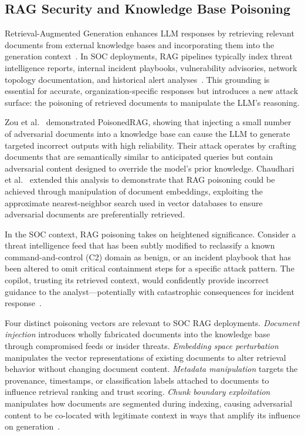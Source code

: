 \documentclass[journal,twoside]{IEEEtran}
\begin{document}
\subsection{RAG Security and Knowledge Base Poisoning}
\label{sec:bg_rag}

Retrieval-Augmented Generation enhances LLM responses by retrieving relevant documents from external knowledge bases and incorporating them into the generation context~\cite{lewis2020rag}. In SOC deployments, RAG pipelines typically index threat intelligence reports, internal incident playbooks, vulnerability advisories, network topology documentation, and historical alert analyses~\cite{gao2024rag}. This grounding is essential for accurate, organization-specific responses but introduces a new attack surface: the poisoning of retrieved documents to manipulate the LLM's reasoning.

Zou et al.~\cite{zou2024poisonedrag} demonstrated PoisonedRAG, showing that injecting a small number of adversarial documents into a knowledge base can cause the LLM to generate targeted incorrect outputs with high reliability. Their attack operates by crafting documents that are semantically similar to anticipated queries but contain adversarial content designed to override the model's prior knowledge. Chaudhari et al.~\cite{chaudhari2024rag} extended this analysis to demonstrate that RAG poisoning could be achieved through manipulation of document embeddings, exploiting the approximate nearest-neighbor search used in vector databases to ensure adversarial documents are preferentially retrieved.

In the SOC context, RAG poisoning takes on heightened significance. Consider a threat intelligence feed that has been subtly modified to reclassify a known command-and-control (C2) domain as benign, or an incident playbook that has been altered to omit critical containment steps for a specific attack pattern. The copilot, trusting its retrieved context, would confidently provide incorrect guidance to the analyst---potentially with catastrophic consequences for incident response~\cite{mirsky2023threat}.

Four distinct poisoning vectors are relevant to SOC RAG deployments. \emph{Document injection} introduces wholly fabricated documents into the knowledge base through compromised feeds or insider threats. \emph{Embedding space perturbation} manipulates the vector representations of existing documents to alter retrieval behavior without changing document content. \emph{Metadata manipulation} targets the provenance, timestamps, or classification labels attached to documents to influence retrieval ranking and trust scoring. \emph{Chunk boundary exploitation} manipulates how documents are segmented during indexing, causing adversarial content to be co-located with legitimate context in ways that amplify its influence on generation~\cite{zou2024poisonedrag,chaudhari2024rag}.
\end{document}
